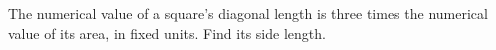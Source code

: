 The numerical value of a square's diagonal length is three times the numerical value of its area, in fixed units. Find its side length.
